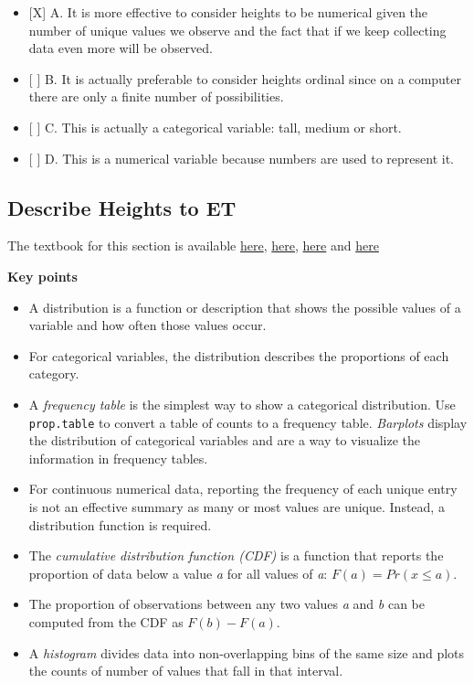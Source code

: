 \documentclass[]{article}
\providecommand{\tightlist}{%
  \setlength{\itemsep}{0pt}\setlength{\parskip}{0pt}}
\begin{document}
\begin{itemize}
\tightlist
\item
  {[}X{]} A. It is more effective to consider heights to be numerical
  given the number of unique values we observe and the fact that if we
  keep collecting data even more will be observed.
\item
  {[} {]} B. It is actually preferable to consider heights ordinal since
  on a computer there are only a finite number of possibilities.
\item
  {[} {]} C. This is actually a categorical variable: tall, medium or
  short.
\item
  {[} {]} D. This is a numerical variable because numbers are used to
  represent it.
\end{itemize}

\hypertarget{describe-heights-to-et}{%
\subsection{Describe Heights to ET}\label{describe-heights-to-et}}

The textbook for this section is available
\href{https://rafalab.github.io/dsbook/distributions.html\#case-study-describing-student-heights}{here},
\href{https://rafalab.github.io/dsbook/distributions.html\#distribution-function}{here},
\href{https://rafalab.github.io/dsbook/distributions.html\#cdf-intro}{here}
and
\href{https://rafalab.github.io/dsbook/distributions.html\#histograms}{here}

\textbf{Key points}

\begin{itemize}
\tightlist
\item
  A distribution is a function or description that shows the possible
  values of a variable and how often those values occur.
\item
  For categorical variables, the distribution describes the proportions
  of each category.
\item
  A \emph{frequency table} is the simplest way to show a categorical
  distribution. Use \texttt{prop.table} to convert a table of counts to
  a frequency table. \emph{Barplots} display the distribution of
  categorical variables and are a way to visualize the information in
  frequency tables.
\item
  For continuous numerical data, reporting the frequency of each unique
  entry is not an effective summary as many or most values are unique.
  Instead, a distribution function is required.
\item
  The \emph{cumulative distribution function (CDF)} is a function that
  reports the proportion of data below a value \emph{a} for all values
  of \emph{a}: \(F(a) = Pr(x \le a)\).
\item
  The proportion of observations between any two values \emph{a} and
  \emph{b} can be computed from the CDF as \(F(b) - F(a)\).
\item
  A \emph{histogram} divides data into non-overlapping bins of the same
  size and plots the counts of number of values that fall in that
  interval.
\end{itemize}
\end{document}
